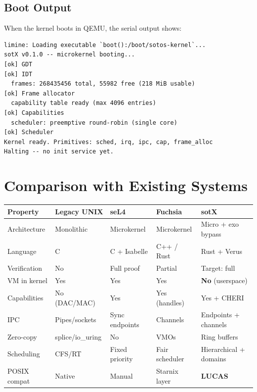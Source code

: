 \documentclass[11pt,a4paper]{article}
\begin{document}
\subsection{Boot Output}

When the kernel boots in QEMU, the serial output shows:

\begin{lstlisting}[style=rust, numbers=none, frame=single, backgroundcolor=\color{black!90},
  basicstyle=\ttfamily\small\color{green!70}]
limine: Loading executable `boot():/boot/sotos-kernel`...
sotX v0.1.0 -- microkernel booting...
[ok] GDT
[ok] IDT
  frames: 268435456 total, 55982 free (218 MiB usable)
[ok] Frame allocator
  capability table ready (max 4096 entries)
[ok] Capabilities
  scheduler: preemptive round-robin (single core)
[ok] Scheduler
Kernel ready. Primitives: sched, irq, ipc, cap, frame_alloc
Halting -- no init service yet.
\end{lstlisting}

\section{Comparison with Existing Systems}

\begin{center}
\begin{tabularx}{\textwidth}{l *{4}{>{\centering\arraybackslash}X}}
\toprule
\textbf{Property} & \textbf{Legacy UNIX} & \textbf{seL4} & \textbf{Fuchsia} & \textbf{sotX} \\
\midrule
Architecture      & Monolithic     & Microkernel    & Microkernel      & Micro + exo bypass \\
Language          & C              & C + Isabelle   & C++ / Rust       & Rust + Verus \\
Verification      & No             & Full proof     & Partial          & Target: full \\
VM in kernel      & Yes            & Yes            & Yes              & \textbf{No} (userspace) \\
Capabilities      & No (DAC/MAC)   & Yes            & Yes (handles)    & Yes + CHERI \\
IPC               & Pipes/sockets  & Sync endpoints & Channels         & Endpoints + channels \\
Zero-copy         & splice/io\_uring & No            & VMOs             & Ring buffers \\
Scheduling        & CFS/RT         & Fixed priority & Fair scheduler   & Hierarchical + domains \\
POSIX compat      & Native         & Manual         & Starnix layer    & \textbf{LUCAS} \\
\bottomrule
\end{tabularx}
\end{center}
\end{document}
